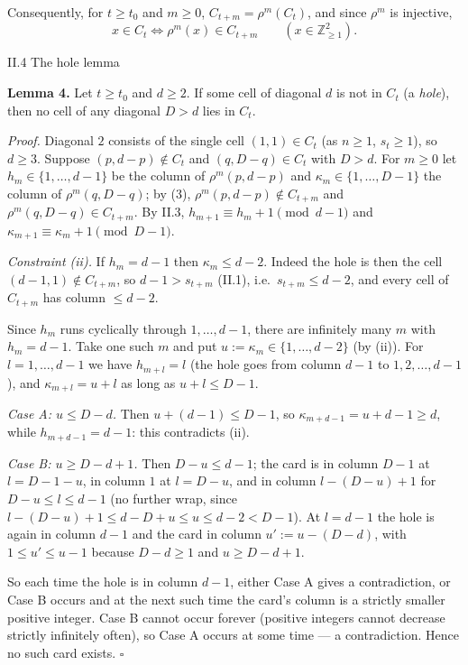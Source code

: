 Consequently, for \(t\ge t_0\) and \(m\ge0\), \(C_{t+m}=\rho^m(C_t)\),
and since \(\rho^m\) is injective,
\[x\in C_t\iff\rho^m(x)\in C_{t+m}\qquad(x\in\mathbb Z_{\ge1}^2). \tag{3}\]

II.4 The hole lemma

\textbf{Lemma 4.} Let \(t\ge t_0\) and \(d\ge2\). If some cell of
diagonal \(d\) is not in \(C_t\) (a \emph{hole}), then no cell of any
diagonal \(D>d\) lies in \(C_t\).

\emph{Proof.} Diagonal \(2\) consists of the single cell
\((1,1)\in C_t\) (as \(n\ge1\), \(s_t\ge1\)), so \(d\ge3\). Suppose
\((p,d-p)\notin C_t\) and \((q,D-q)\in C_t\) with \(D>d\). For \(m\ge0\)
let \(h_m\in\{1,\dots,d-1\}\) be the column of \(\rho^m(p,d-p)\) and
\(\kappa_m\in\{1,\dots,D-1\}\) the column of \(\rho^m(q,D-q)\); by (3),
\(\rho^m(p,d-p)\notin C_{t+m}\) and \(\rho^m(q,D-q)\in C_{t+m}\). By
II.3, \(h_{m+1}\equiv h_m+1\pmod{d-1}\) and
\(\kappa_{m+1}\equiv\kappa_m+1\pmod{D-1}\).

\emph{Constraint (ii).} If \(h_m=d-1\) then \(\kappa_m\le d-2\). Indeed
the hole is then the cell \((d-1,1)\notin C_{t+m}\), so \(d-1>s_{t+m}\)
(II.1), i.e.~\(s_{t+m}\le d-2\), and every cell of \(C_{t+m}\) has
column \(\le d-2\).

Since \(h_m\) runs cyclically through \(1,\dots,d-1\), there are
infinitely many \(m\) with \(h_m=d-1\). Take one such \(m\) and put
\(u:=\kappa_m\in\{1,\dots,d-2\}\) (by (ii)). For \(l=1,\dots,d-1\) we
have \(h_{m+l}=l\) (the hole goes from column \(d-1\) to
\(1,2,\dots,d-1\)), and \(\kappa_{m+l}=u+l\) as long as \(u+l\le D-1\).

\emph{Case A: \(u\le D-d\).} Then \(u+(d-1)\le D-1\), so
\(\kappa_{m+d-1}=u+d-1\ge d\), while \(h_{m+d-1}=d-1\): this contradicts
(ii).

\emph{Case B: \(u\ge D-d+1\).} Then \(D-u\le d-1\); the card is in
column \(D-1\) at \(l=D-1-u\), in column \(1\) at \(l=D-u\), and in
column \(l-(D-u)+1\) for \(D-u\le l\le d-1\) (no further wrap, since
\(l-(D-u)+1\le d-D+u\le u\le d-2<D-1\)). At \(l=d-1\) the hole is again
in column \(d-1\) and the card in column \(u':=u-(D-d)\), with
\(1\le u'\le u-1\) because \(D-d\ge1\) and \(u\ge D-d+1\).

So each time the hole is in column \(d-1\), either Case A gives a
contradiction, or Case B occurs and at the next such time the card's
column is a strictly smaller positive integer. Case B cannot occur
forever (positive integers cannot decrease strictly infinitely often),
so Case A occurs at some time --- a contradiction. Hence no such card
exists. \(\square\)

